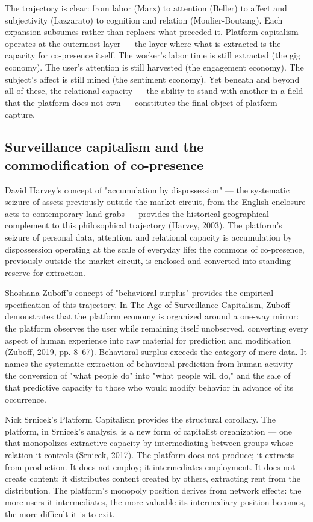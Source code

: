 The trajectory is clear: from labor (Marx) to attention (Beller) to affect and subjectivity (Lazzarato) to cognition and relation (Moulier-Boutang). Each expansion subsumes rather than replaces what preceded it. Platform capitalism operates at the outermost layer — the layer where what is extracted is the capacity for co-presence itself. The worker's labor time is still extracted (the gig economy). The user's attention is still harvested (the engagement economy). The subject's affect is still mined (the sentiment economy). Yet beneath and beyond all of these, the relational capacity — the ability to stand with another in a field that the platform does not own — constitutes the final object of platform capture.

\subsection{Surveillance capitalism and the commodification of co-presence}

David Harvey's concept of "accumulation by dispossession" — the systematic seizure of assets previously outside the market circuit, from the English enclosure acts to contemporary land grabs — provides the historical-geographical complement to this philosophical trajectory (Harvey, 2003). The platform's seizure of personal data, attention, and relational capacity is accumulation by dispossession operating at the scale of everyday life: the commons of co-presence, previously outside the market circuit, is enclosed and converted into standing-reserve for extraction.

Shoshana Zuboff's concept of "behavioral surplus" provides the empirical specification of this trajectory. In The Age of Surveillance Capitalism, Zuboff demonstrates that the platform economy is organized around a one-way mirror: the platform observes the user while remaining itself unobserved, converting every aspect of human experience into raw material for prediction and modification (Zuboff, 2019, pp. 8–67). Behavioral surplus exceeds the category of mere data. It names the systematic extraction of behavioral prediction from human activity — the conversion of "what people do" into "what people will do," and the sale of that predictive capacity to those who would modify behavior in advance of its occurrence.

Nick Srnicek's Platform Capitalism provides the structural corollary. The platform, in Srnicek's analysis, is a new form of capitalist organization — one that monopolizes extractive capacity by intermediating between groups whose relation it controls (Srnicek, 2017). The platform does not produce; it extracts from production. It does not employ; it intermediates employment. It does not create content; it distributes content created by others, extracting rent from the distribution. The platform's monopoly position derives from network effects: the more users it intermediates, the more valuable its intermediary position becomes, the more difficult it is to exit.

